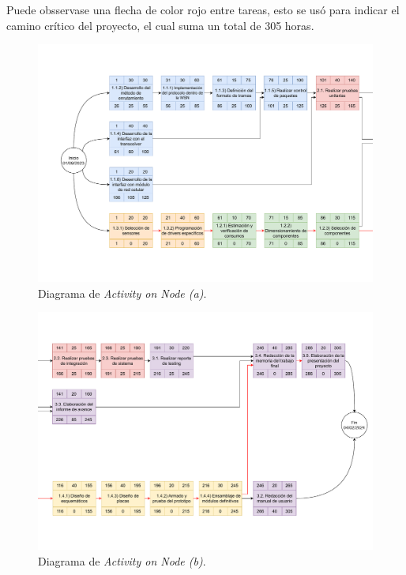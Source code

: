 \documentclass[
11pt, %
codirector, %
]{charter}
\begin{document}
Puede obsservase una flecha de color rojo entre tareas, esto se usó para indicar el camino crítico del proyecto, el cual suma un total de 305 horas.

\begin{landscape}
\begin{figure}[htpb]
\centering 
\includegraphics[height=0.85\textheight]{./Figuras/AoN-1.pdf}
\caption{Diagrama de \textit{Activity on Node (a)}.}
\label{fig:AoN-1}
\end{figure}
\end{landscape}

\begin{landscape}
\begin{figure}[htpb]
\centering 
\includegraphics[height=0.85\textheight]{./Figuras/AoN-2.pdf}
\caption{Diagrama de \textit{Activity on Node (b)}.}
\label{fig:AoN-2}
\end{figure}
\end{landscape}
\end{document}
